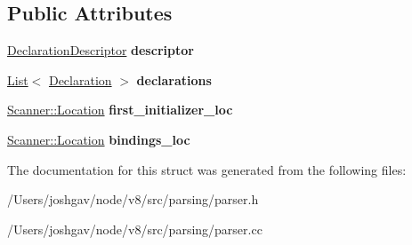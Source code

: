 \subsection*{Public Attributes}
\begin{DoxyCompactItemize}
\item 
\hyperlink{structv8_1_1internal_1_1_parser_1_1_declaration_descriptor}{Declaration\+Descriptor} {\bfseries descriptor}\hypertarget{structv8_1_1internal_1_1_parser_1_1_declaration_parsing_result_a8017a8477a51c7a1a188a61d552a42d5}{}\label{structv8_1_1internal_1_1_parser_1_1_declaration_parsing_result_a8017a8477a51c7a1a188a61d552a42d5}

\item 
\hyperlink{classv8_1_1internal_1_1_list}{List}$<$ \hyperlink{structv8_1_1internal_1_1_parser_1_1_declaration_parsing_result_1_1_declaration}{Declaration} $>$ {\bfseries declarations}\hypertarget{structv8_1_1internal_1_1_parser_1_1_declaration_parsing_result_a229d8554a2d0a303dfc3c065b271ebf6}{}\label{structv8_1_1internal_1_1_parser_1_1_declaration_parsing_result_a229d8554a2d0a303dfc3c065b271ebf6}

\item 
\hyperlink{structv8_1_1internal_1_1_scanner_1_1_location}{Scanner\+::\+Location} {\bfseries first\+\_\+initializer\+\_\+loc}\hypertarget{structv8_1_1internal_1_1_parser_1_1_declaration_parsing_result_a7706c9979b6b4e4785242836d70d01fa}{}\label{structv8_1_1internal_1_1_parser_1_1_declaration_parsing_result_a7706c9979b6b4e4785242836d70d01fa}

\item 
\hyperlink{structv8_1_1internal_1_1_scanner_1_1_location}{Scanner\+::\+Location} {\bfseries bindings\+\_\+loc}\hypertarget{structv8_1_1internal_1_1_parser_1_1_declaration_parsing_result_a7cc080ab67ec1542d6b2468892eb07f2}{}\label{structv8_1_1internal_1_1_parser_1_1_declaration_parsing_result_a7cc080ab67ec1542d6b2468892eb07f2}

\end{DoxyCompactItemize}


The documentation for this struct was generated from the following files\+:\begin{DoxyCompactItemize}
\item 
/\+Users/joshgav/node/v8/src/parsing/parser.\+h\item 
/\+Users/joshgav/node/v8/src/parsing/parser.\+cc\end{DoxyCompactItemize}
